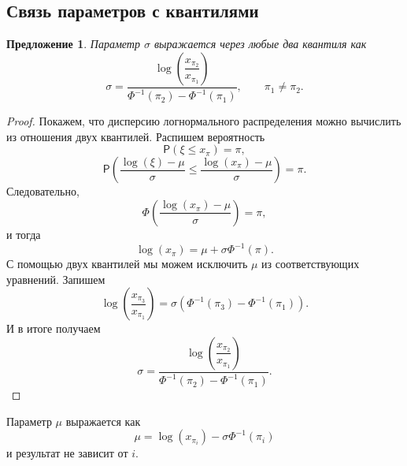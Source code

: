 \documentclass[specialist, substylefile = spbu.rtx,
subf,href,colorlinks=true, 12pt]{disser}
\newtheorem{proposition}[theorem]{Предложение}
\begin{document}
	\subsection{Связь параметров с квантилями}
	\begin{proposition}\label{pr3}
		Параметр $\sigma$ выражается через любые два квантиля как
		\begin{equation}
			\displaystyle{\sigma = \dfrac{\log\left(\dfrac{x_{\pi_{2}}}{x_{\pi_{1}}}\right)}{\Phi ^{-1}(\pi_{2}) - \Phi ^{-1}(\pi_{1})}}, \quad \quad \pi_{1}\neq \pi_{2}. \label{11}
		\end{equation} 
	\end{proposition}
	\begin{proof}
		Покажем, что дисперсию логнормального распределения можно вычислить из отношения двух квантилей. Распишем вероятность 
		\begin{equation*}
			\mathsf{P}(\xi\leq x_{\pi}) = \pi,
		\end{equation*}
		\begin{equation*}
			\displaystyle{\mathsf{P}\left(\frac{\log(\xi)-\mu }{\sigma }\leq \frac{\log(x_{\pi})-\mu}{\sigma}\right) = \pi}.
		\end{equation*}
		Следовательно,
		\begin{equation*}
			\displaystyle{\Phi \left(\frac{\log(x_{\pi})-\mu}{\sigma}\right)=\pi},
		\end{equation*}
		и тогда
		\begin{equation*}
			\log(x_{\pi})=\mu + \sigma\Phi ^{-1}(\pi).
		\end{equation*}
		С помощью двух квантилей мы можем исключить $\mu$ из соответствующих уравнений. Запишем
		\begin{equation*}
			\log\left(\frac{x_{\pi_{3}}}{x_{\pi_{1}}}\right) = \sigma(\Phi ^{-1}(\pi_{3})-\Phi ^{-1}(\pi_{1})).
		\end{equation*}
		И в итоге получаем
		\begin{equation*}
			\displaystyle{\sigma = \dfrac{\log\left(\dfrac{x_{\pi_{2}}}{x_{\pi_{1}}}\right)}{\Phi ^{-1}(\pi_{2}) - \Phi ^{-1}(\pi_{1})}}.
		\end{equation*}
	\end{proof}
	
	Параметр $\mu$ выражается как
	\begin{equation}
		\mu = \log(x_{\pi_{i}}) - \sigma\Phi ^{-1}(\pi_{i}) \label{12}
	\end{equation}
	и результат не зависит от $i$.
	
\end{document}
